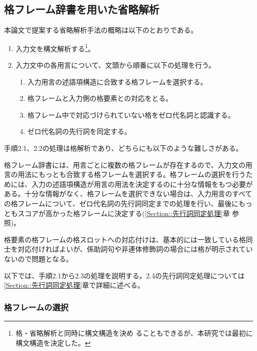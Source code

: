 \documentclass{nlp}
\begin{document}
\subsection{格フレーム辞書を用いた省略解析}
\label{Section::格フレーム辞書を用いた解析}

本論文で提案する省略解析手法の概略は以下のとおりである。
\begin{enumerate} \itemsep = 0mm \renewcommand{\labelenumii}{}
 \item 入力文を構文解析する\footnote{格・省略解析と同時に構文構造を決め
ることもできるが、本研究では最初に構文構造を決定した。}。
 \item 入力文中の各用言について、文頭から順番に以下の処理を行う。\label{省略解析アルゴリズム::用言ごと}
 \begin{enumerate}
  \item 入力用言の述語項構造に合致する格フレームを選択する。\label{省略
	解析アルゴリズム::格フレーム選択}
  \item 格フレームと入力側の格要素との対応をとる。\label{省略解析アルゴ
	リズム::格要素対応}
  \item 格フレーム中で対応づけられていない格をゼロ代名詞と認識する。
	\label{省略解析アルゴリズム::ゼロ代名詞認識}
  \item ゼロ代名詞の先行詞を同定する。\label{省略解析アルゴリズム::先行詞同定}
 \end{enumerate}
\end{enumerate}

\vspace*{2ex}

手順2.1、2.2の処理は格解析であり、どちらにも以下のような難しさがある。

格フレーム辞書には、用言ごとに複数の格フレームが存在するので、入力文の用
言の用法にもっとも合致する格フレームを選択する。格フレームの選択を行うた
めには、入力の述語項構造が用言の用法を決定するのに十分な情報をもつ必要が
ある。十分な情報がなく、格フレームを選択できない場合は、入力用言のすべて
の格フレームについて、ゼロ代名詞の先行詞同定までの処理を行い、最後にもっ
ともスコアが高かった格フレームに決定する(\ref{Section::先行詞同定処理}章
参照)。

格要素の格フレームの格スロットへの対応付けは、基本的には一致している格同
士を対応付ければよいが、係助詞句や非連体修飾詞の場合には格が明示されてい
ないので問題となる。

以下では、手順2.1から2.3の処理を説明する。2.4の先行詞同定処理については
\ref{Section::先行詞同定処理}章で詳細に述べる。


\subsubsection{格フレームの選択} 
\end{document}
